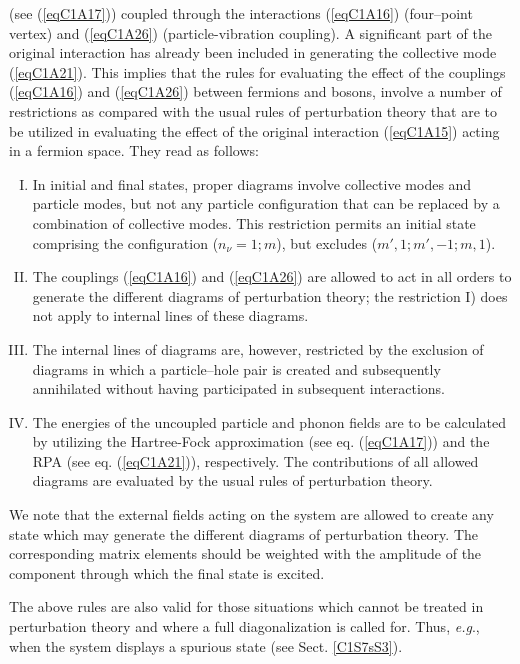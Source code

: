 (see (\ref{eqC1A17})) coupled through the interactions (\ref{eqC1A16}) (four--point vertex) and (\ref{eqC1A26}) (particle-vibration coupling). A significant
part of the original interaction has already been included in generating the
collective mode (\ref{eqC1A21}). This implies that the rules for evaluating the effect of
the couplings (\ref{eqC1A16}) and (\ref{eqC1A26}) between fermions and bosons, involve a number of restrictions as compared with the usual rules of perturbation theory that
are to be utilized in evaluating the effect of the original interaction (\ref{eqC1A15}) acting
in a fermion space. They read as follows:
\begin{enumerate}[I)]
\item In initial and final states, proper diagrams involve collective modes
and particle modes, but not any particle configuration that can be replaced by
a combination of collective modes. This restriction permits an initial state
comprising the configuration ($n_\nu =1;m$), but excludes ($m', 1; m',-1; m,1$).
\item The couplings (\ref{eqC1A16}) and (\ref{eqC1A26}) are allowed to act in all orders to
generate the different diagrams of perturbation theory; the restriction I) does
not apply to internal lines of these diagrams.
\item The internal lines of diagrams are, however, restricted by the exclusion of diagrams in which a particle--hole pair is created and subsequently
annihilated without having participated in subsequent interactions.
\item The energies of the uncoupled particle and phonon fields are to be
calculated by utilizing the Hartree-Fock approximation (see eq. (\ref{eqC1A17})) and the
RPA (see eq. (\ref{eqC1A21})), respectively. The contributions of all allowed diagrams are
evaluated by the usual rules of perturbation theory.
\end{enumerate}

We note that the external fields acting on the system are allowed to create
any state which may generate the different diagrams of perturbation theory.
The corresponding matrix elements should be weighted with the amplitude of
the component through which the final state is excited.



The above rules are also valid for those situations which cannot be treated
in perturbation theory and where a full diagonalization is called for. Thus,
\textit{e.g}., when the system displays a spurious state (see Sect. \ref{C1S7sS3}).



